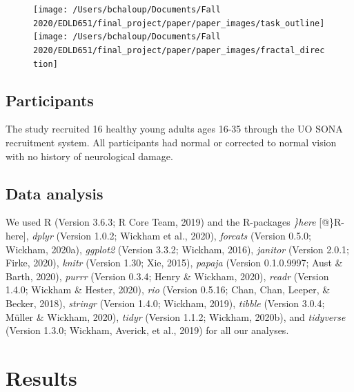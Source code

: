 \documentclass[english,jou]{apa6}
\begin{document}
\begin{figure}

{\centering \texttt{[image: /Users/bchaloup/Documents/Fall 2020/EDLD651/final\_project/paper/paper\_images/task\_outline]} \texttt{[image: /Users/bchaloup/Documents/Fall 2020/EDLD651/final\_project/paper/paper\_images/fractal\_direction]} 

}

\caption{ }\label{fig:unnamed-chunk-6}
\end{figure}

\hypertarget{participants}{%
\subsection{Participants}\label{participants}}

The study recruited 16 healthy young adults ages 16-35 through the UO SONA recruitment system. All participants had normal or corrected to normal vision with no history of neurological damage.

\hypertarget{data-analysis}{%
\subsection{Data analysis}\label{data-analysis}}

We used R (Version 3.6.3; R Core Team, 2019) and the R-packages \emph{\}here} {[}@\}R-here{]}, \emph{dplyr} (Version 1.0.2; Wickham et al., 2020), \emph{forcats} (Version 0.5.0; Wickham, 2020a), \emph{ggplot2} (Version 3.3.2; Wickham, 2016), \emph{janitor} (Version 2.0.1; Firke, 2020), \emph{knitr} (Version 1.30; Xie, 2015), \emph{papaja} (Version 0.1.0.9997; Aust \& Barth, 2020), \emph{purrr} (Version 0.3.4; Henry \& Wickham, 2020), \emph{readr} (Version 1.4.0; Wickham \& Hester, 2020), \emph{rio} (Version 0.5.16; Chan, Chan, Leeper, \& Becker, 2018), \emph{stringr} (Version 1.4.0; Wickham, 2019), \emph{tibble} (Version 3.0.4; Müller \& Wickham, 2020), \emph{tidyr} (Version 1.1.2; Wickham, 2020b), and \emph{tidyverse} (Version 1.3.0; Wickham, Averick, et al., 2019) for all our analyses.

\hypertarget{results}{%
\section{Results}\label{results}}
\end{document}
